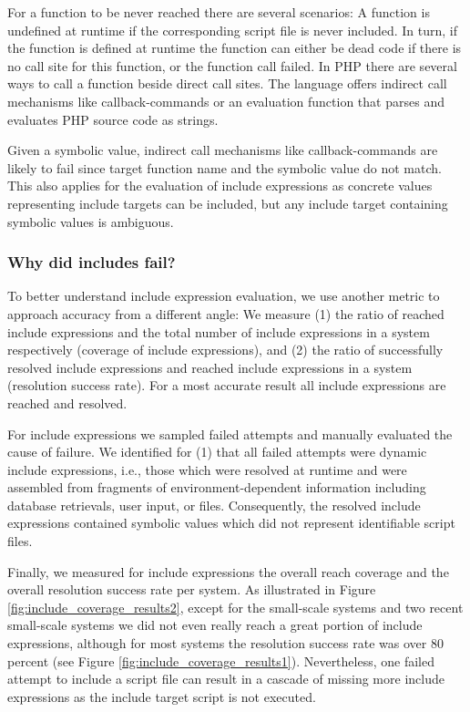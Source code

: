 \documentclass[preprint]{sig-alternate-05-2015}
\begin{document}
For a function to be never reached there are several scenarios: A function is undefined at runtime if the corresponding script file is never included. In turn, if the function is defined at runtime the function can either be dead code if there is no call site for this function, or the function call failed. In PHP there are several ways to call a function beside direct call sites. The language offers indirect call mechanisms like callback-commands or an evaluation function that parses and evaluates PHP source code as strings.

Given a symbolic value, indirect call mechanisms like callback-commands are likely to fail since target function name and the symbolic value do not match. This also applies for the evaluation of include expressions as concrete values representing include targets can be included, but any include target containing symbolic values is ambiguous.

\subsubsection{Why did includes fail?}
\label{WhyDidIncludesFail}
To better understand include expression evaluation, we use another metric to approach accuracy from a different angle: We measure (1) the ratio of reached include expressions and the total number of include expressions in a system respectively (coverage of include expressions), and (2) the ratio of successfully resolved include expressions and reached include expressions in a system (resolution success rate). For a most accurate result all include expressions are reached and resolved.

For include expressions we sampled failed attempts and manually evaluated the cause of failure. We identified for (1) that all failed attempts were dynamic include expressions, i.e., those which were resolved at runtime and were assembled from fragments of environment-dependent information including database retrievals, user input, or files. Consequently, the resolved include expressions contained symbolic values which did not represent identifiable script files.

Finally, we measured for include expressions the overall reach coverage and the overall resolution success rate per system. As illustrated in Figure \ref{fig:include_coverage_results2}, except for the small-scale systems and two recent small-scale systems we did not even really reach a great portion of include expressions, although for most systems the resolution success rate was over 80 percent (see Figure \ref{fig:include_coverage_results1}). Nevertheless, one failed attempt to include a script file can result in a cascade of missing more include expressions as the include target script is not executed.
\end{document}
